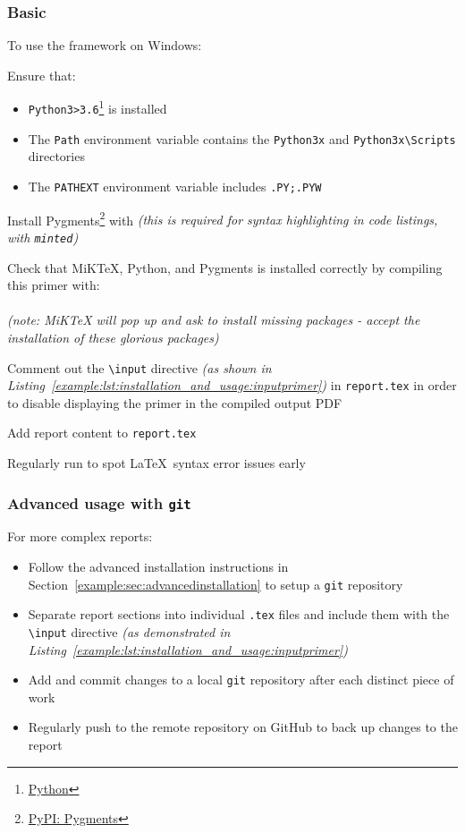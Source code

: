 \subsubsection{Basic}
To use the \uswdwmspkg{} framework on Windows:
\begin{methodology0}
  \item Ensure that:
    \begin{itemize}
      \item \texttt{Python3>3.6}\footnote{\href{https://www.python.org/}{Python}} is installed
      \item The \texttt{Path} environment variable contains the \texttt{Python3x} and \texttt{Python3x\textbackslash Scripts} directories
      \item The \texttt{PATHEXT} environment variable includes \texttt{.PY;.PYW}
    \end{itemize}
  \item Install Pygments\footnote{\href{https://pypi.org/project/Pygments/}{PyPI: Pygments}} with  \textit{(this is required for syntax highlighting in code listings, with \texttt{minted})}
  \item Check that MiKTeX, Python, and Pygments is installed correctly by compiling this primer with:\\
   \\
   \textit{(note: MiKTeX will pop up and ask to install missing packages - accept the installation of these glorious packages)}
  \item Comment out the \texttt{\textbackslash input} directive \textit{(as shown in Listing~\ref{example:lst:installation_and_usage:inputprimer})} in \texttt{report.tex} in order to disable displaying the primer in the compiled output PDF
  \item Add report content to \texttt{report.tex}
  \item Regularly run  to spot \LaTeX\ syntax error issues early
\end{methodology0}

\subsubsection{Advanced usage with \texttt{git}}
For more complex reports:
\begin{itemize}
  \item Follow the advanced installation instructions in Section~\ref{example:sec:advancedinstallation} to setup a \texttt{git} repository
  \item Separate report sections into individual \texttt{.tex} files and include them with the \texttt{\textbackslash input} directive \textit{(as demonstrated in Listing~\ref{example:lst:installation_and_usage:inputprimer})}
  \item Add and commit changes to a local \texttt{git} repository after each distinct piece of work
  \item Regularly push to the remote repository on GitHub to back up changes to the report
\end{itemize}

